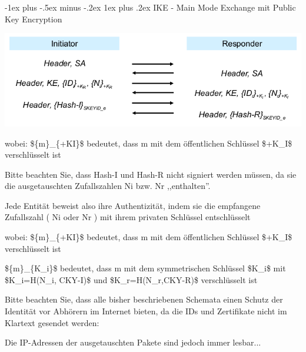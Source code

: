 \documentclass[a4paper]{article}
\makeatletter
\renewcommand{\subsubsection}{\@startsection{subsubsection}{3}{0mm}%
 {-1ex plus -.5ex minus -.2ex}%
 {1ex plus .2ex}%
 {\normalfont\small\bfseries}}
\makeatother
\begin{document}
\begin{multicols}{3}
\begin{itemize*}
            \subsubsection{IKE - Main Mode Exchange mit Public Key
                  Encryption}
            \begin{itemize*}
                  \item \includegraphics[width=\linewidth]{Assets/NetworkSecurity-IKE-exchange-public-key.png}
                  \begin{itemize*}
                        \item wobei: \$\{m\}\_\{+KI\}\$ bedeutet, dass m mit dem öffentlichen Schlüssel \$+K\_I\$ verschlüsselt ist
                        \item Bitte beachten Sie, dass Hash-I und Hash-R nicht signiert werden müssen, da sie die ausgetauschten Zufallszahlen Ni bzw. Nr ,,enthalten''.
                        \begin{itemize*} \item Jede Entität beweist also ihre Authentizität, indem sie die empfangene Zufallszahl ( Ni oder Nr ) mit ihrem privaten Schlüssel entschlüsselt \end{itemize*}
                  \end{itemize*}
                  \begin{itemize*}
                        \item wobei: \$\{m\}\_\{+KI\}\$ bedeutet, dass m mit dem öffentlichen Schlüssel \$+K\_I\$ verschlüsselt ist
                        \item \$\{m\}\_\{K\_i\}\$ bedeutet, dass m mit dem symmetrischen Schlüssel \$K\_i\$ mit \$K\_i=H(N\_i, CKY-I)\$ und \$K\_r=H(N\_r,CKY-R)\$ verschlüsselt ist
                        \item Bitte beachten Sie, dass alle bisher beschriebenen Schemata einen Schutz der Identität vor Abhörern im Internet bieten, da die IDs und Zertifikate nicht im Klartext gesendet werden:
                        \item Die IP-Adressen der ausgetauschten Pakete sind jedoch immer lesbar...
                  \end{itemize*}
            \end{itemize*}


\end{itemize*}
\end{multicols}
\end{document}
